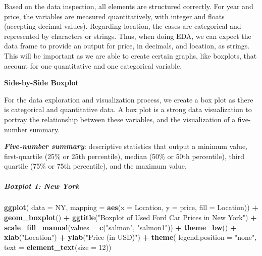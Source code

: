 \documentclass[
]{article}
\newenvironment{Shaded}{\begin{snugshade}}{\end{snugshade}}
\newcommand{\AttributeTok}[1]{\textcolor[rgb]{0.13,0.29,0.53}{#1}}
\newcommand{\DecValTok}[1]{\textcolor[rgb]{0.00,0.00,0.81}{#1}}
\newcommand{\FunctionTok}[1]{\textcolor[rgb]{0.13,0.29,0.53}{\textbf{#1}}}
\newcommand{\NormalTok}[1]{#1}
\newcommand{\SpecialCharTok}[1]{\textcolor[rgb]{0.81,0.36,0.00}{\textbf{#1}}}
\newcommand{\StringTok}[1]{\textcolor[rgb]{0.31,0.60,0.02}{#1}}
\begin{document}
Based on the data inspection, all elements are structured correctly. For
year and price, the variables are measured quantitatively, with integer
and floats (accepting decimal values). Regarding location, the cases are
categorical and represented by characters or strings. Thus, when doing
EDA, we can expect the data frame to provide an output for price, in
decimals, and location, as strings. This will be important as we are
able to create certain graphs, like boxplots, that account for one
quantitative and one categorical variable.

\textbf{Side-by-Side Boxplot}

For the data exploration and visualization process, we create a box plot
as there is categorical and quantitative data. A box plot is a strong
data visualization to portray the relationship between these variables,
and the visualization of a five-number summary.

\textbf{\emph{Five-number summary}}: descriptive statistics that output
a minimum value, first-quartile (25\% or 25th percentile), median (50\%
or 50th percentile), third quartile (75\% or 75th percentile), and the
maximum value.

\hypertarget{boxplot-1-new-york}{%
\subparagraph{Boxplot 1: New York}\label{boxplot-1-new-york}}

\begin{Shaded}
\begin{Highlighting}[]
\FunctionTok{ggplot}\NormalTok{(}
\AttributeTok{data =}\NormalTok{ NY,}
\AttributeTok{mapping =} \FunctionTok{aes}\NormalTok{(}\AttributeTok{x =}\NormalTok{ Location, }\AttributeTok{y =}\NormalTok{ price, }\AttributeTok{fill =}\NormalTok{ Location)) }\SpecialCharTok{+}
  \FunctionTok{geom\_boxplot}\NormalTok{() }\SpecialCharTok{+}
  \FunctionTok{ggtitle}\NormalTok{(}\StringTok{"Boxplot of Used Ford Car Prices in New York"}\NormalTok{) }\SpecialCharTok{+}
  \FunctionTok{scale\_fill\_manual}\NormalTok{(}\AttributeTok{values =} \FunctionTok{c}\NormalTok{(}\StringTok{"salmon"}\NormalTok{, }\StringTok{"salmon1"}\NormalTok{)) }\SpecialCharTok{+}
  \FunctionTok{theme\_bw}\NormalTok{() }\SpecialCharTok{+}
  \FunctionTok{xlab}\NormalTok{(}\StringTok{"Location"}\NormalTok{) }\SpecialCharTok{+}
  \FunctionTok{ylab}\NormalTok{(}\StringTok{"Price (in USD)"}\NormalTok{) }\SpecialCharTok{+}
  \FunctionTok{theme}\NormalTok{(}
  \AttributeTok{legend.position =} \StringTok{"none"}\NormalTok{,}
  \AttributeTok{text =} \FunctionTok{element\_text}\NormalTok{(}\AttributeTok{size =} \DecValTok{12}\NormalTok{))}
\end{Highlighting}
\end{Shaded}
\end{document}
